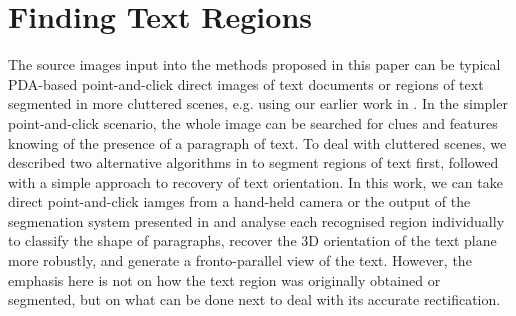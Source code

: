 \section{Finding Text Regions}   \label{recoveryusinglines}



The source images input into the methods proposed in this paper can be typical
PDA-based point-and-click direct images of text documents or regions of text
segmented in more cluttered scenes, e.g. using our earlier work in
\cite{clark-ijdar-2001}. In the simpler point-and-click scenario, 
the whole image can be searched for clues and features knowing of the presence
of a paragraph of text. To deal with cluttered scenes, we described two alternative
algorithms in \cite{clark-ijdar-2001} to segment regions of text first, followed
with a simple approach to recovery of text orientation. In this work, we can
take direct point-and-click iamges from a hand-held camera or 
the output of the segmenation system presented in
\cite{clark-ijdar-2001} and analyse each recognised region individually to
classify the shape of paragraphs, recover the 3D orientation of the text plane
more robustly, and generate a fronto-parallel view of the text. However, the
emphasis here is not on how the text region was originally obtained or
segmented, but on what can be done next to deal with its accurate rectification.


